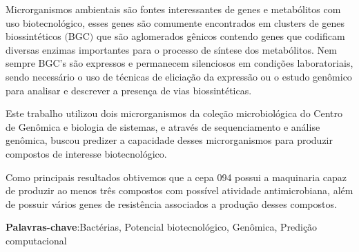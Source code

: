 \setlength{\absparsep}{18pt} %
\begin{resumo}
Microrganismos ambientais são fontes interessantes de genes e metabólitos
com uso biotecnológico, esses genes são comumente encontrados em clusters de genes biossintéticos $($BGC$)$
que são aglomerados gênicos contendo genes que codificam diversas enzimas importantes
para o processo de síntese dos metabólitos. Nem sempre BGC's são expressos e permanecem 
silenciosos em condições laboratoriais, sendo necessário o uso de técnicas de eliciação
da expressão ou o estudo genômico para analisar e descrever a presença de vias biossintéticas.

Este trabalho utilizou dois microrganismos da coleção microbiológica do
Centro de Genômica e biologia de sistemas, e através de sequenciamento
e análise genômica, buscou predizer a capacidade desses microrganismos
para produzir  compostos de interesse biotecnológico.

Como principais resultados obtivemos que a cepa 094 possui a maquinaria
capaz de produzir ao menos três compostos com possível atividade antimicrobiana, 
além de possuir vários genes de resistência associados a produção desses compostos.

\textbf{Palavras-chave}:Bactérias, Potencial biotecnológico, Genômica, Predição computacional
\end{resumo}

%
% 

% 

%  
